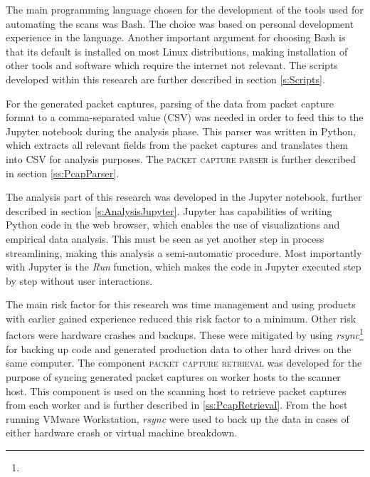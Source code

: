 The main programming language chosen for the development of the tools used for automating the scans was Bash. The choice was based on personal development experience in the language.
Another important argument for choosing Bash is that its default is installed on most Linux distributions, making installation of other tools and software which require the internet not relevant.
The scripts developed within this research are further described in section \ref{s:Scripts}.

For the generated packet captures, parsing of the data from packet capture format to a comma-separated value (CSV) was needed in order to feed this to the Jupyter notebook during the analysis phase.
This parser was written in Python, which extracts all relevant fields from the packet captures and translates them into CSV for analysis purposes.
The \textsc{packet capture parser} is further described in section \ref{ss:PcapParser}.

The analysis part of this research was developed in the Jupyter notebook, further described in section \ref{s:AnalysisJupyter}.
Jupyter has capabilities of writing Python code in the web browser, which enables the use of visualizations and empirical data analysis.
This must be seen as yet another step in process streamlining, making this analysis a semi-automatic procedure.
Most importantly with Jupyter is the \textit{Run} function, which makes the code in Jupyter executed step by step without user interactions.

The main risk factor for this research was time management and using products with earlier gained experience reduced this risk factor to a minimum.
Other risk factors were hardware crashes and backups. These were mitigated by using \textit{rsync}\footnote{} for backing up code and generated production data to other hard drives on the same computer. The component \textsc{packet capture retrieval} was developed for the purpose of syncing generated packet captures on worker hosts to the scanner host. This component is used on the scanning host to retrieve packet captures from each worker and is further described in \ref{ss:PcapRetrieval}.
From the host running VMware Workstation, \textit{rsync} were used to back up the data in cases of either hardware crash or virtual machine breakdown.


